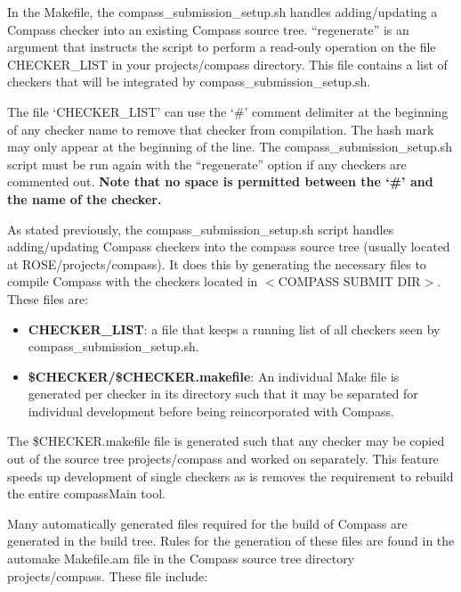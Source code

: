 In the Makefile, the compass\_submission\_setup.sh handles adding/updating a Compass checker into
an existing Compass source tree. ``regenerate'' is an argument that instructs the script to perform a 
read-only operation on the file CHECKER\_LIST in your projects/compass directory. This file contains 
a list of checkers that will be integrated by compass\_submission\_setup.sh.

The file `CHECKER\_LIST' can use the `\#' comment delimiter at the beginning of
any checker name to remove that checker from compilation. The hash mark may
only appear at the beginning of the line. The compass\_submission\_setup.sh
script must be run again with the ``regenerate'' option if any checkers are
commented out. {\bf Note that no space is permitted between the `\#' and the name
of the checker.}

As stated previously, the compass\_submission\_setup.sh script handles
adding/updating Compass checkers into the compass source tree (usually located
at ROSE/projects/compass). It does this by generating the necessary files
to compile Compass with the checkers located in $<$COMPASS SUBMIT DIR$>$. These
files are:

\begin{itemize}
\item {\bf CHECKER\_LIST}: 
	a file that keeps a running list of all checkers seen by 
	compass\_submission\_setup.sh.
\item {\bf \${CHECKER}/\${CHECKER}.makefile}: An individual Make file is
	generated per checker in its directory such that it may be separated
	for individual development before being reincorporated with Compass.
\end{itemize}
%
The \${CHECKER}.makefile file is generated such that any checker may be copied
out of the source tree projects/compass and worked on separately. This feature
speeds up development of single checkers as is removes the requirement to
rebuild the entire compassMain tool.

Many automatically generated files required for the build of Compass are 
generated in the build tree. Rules for the generation of these files are found
in the automake Makefile.am file in the Compass source tree directory 
projects/compass. These file include:

